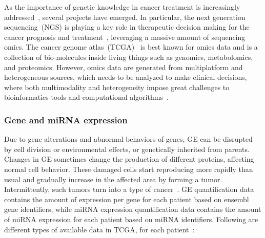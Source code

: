 \hspace*{3.5mm} As the importance of genetic knowledge in cancer treatment is increasingly addressed~\cite{15Wu}, several projects have emerged. In particular, the next generation sequencing~(NGS) is playing a key role in therapeutic decision making for the cancer prognosis and treatment~\cite{jha2017towards}, leveraging a massive amount of sequencing omics. The cancer genome atlas~(TCGA)~\cite{tomczak2015cancer} is best known for omics data and is a collection of bio-molecules inside living things such as genomics, metabolomics, and proteomics. However, omics data are generated from multiplatform and heterogeneous sources, which needs to be analyzed to make clinical decisions, where both multimodality and heterogeneity impose great challenges to bioinformatics tools and computational algorithms~\cite{karimACCESS2019,karimBIB2019}. 


\subsubsection{Gene and miRNA expression}
Due to  gene alterations and abnormal behaviors of genes, GE can be disrupted by cell division or environmental effects, or genetically inherited from parents. Changes in GE sometimes change the production of different proteins, affecting normal cell behavior. These damaged cells start reproducing more rapidly than usual and gradually increase in the affected area by forming a tumor. Intermittently, such tumors turn into a type of cancer~\cite{zuo2019identification,24Podolsky}. GE quantification data contains the amount of expression per gene for each patient based on ensembl gene identifiers, while miRNA expression quantification data contains the amount of miRNA expression for each patient based on miRNA identifiers. Following are different types of available data in TCGA, for each patient~\cite{ncbi1,ncbi2}: 

